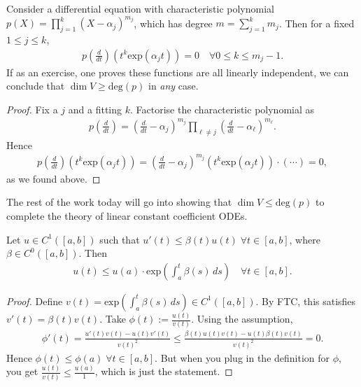 \begin{lemma}\label{lem:polyexp}
    Consider a differential equation with characteristic polynomial $p(X) = \prod_{j=1}^{k}(X-\alpha_{j})^{m_{j}}$, which has degree $m = \sum_{j=1}^{k} m_{j}$. Then for a fixed $1 \leq j \leq k$,
    \begin{align*}
        p \left( \frac{d}{dt} \right) (t^{k} \text{exp}(\alpha_{j} t)) = 0 \quad \forall 0 \leq k \leq m_{j}-1.
    \end{align*}
    If as an exercise, one proves these functions are all linearly independent, we can conclude that $\dim V \geq \text{deg}(p)$ in \textit{any} case.
\end{lemma}
\begin{proof}
    Fix a $j$ and a fitting $k$. Factorise the characteristic polynomial as
    \begin{align*}
        p \left( \frac{d}{dt} \right) = \left( \frac{d}{dt} - \alpha_{j} \right)^{m_{j}} \prod_{\ell \neq j} \left( \frac{d}{dt} - \alpha_{\ell} \right)^{m_{\ell}}.
    \end{align*}
    Hence
    \begin{align*}
        p \left( \frac{d}{dt} \right) \left( t^{k} \text{exp}(\alpha_{j} t) \right) = \left( \frac{d}{dt} - \alpha_{j} \right)^{m_{j}} \left( t^{k} \text{exp}(\alpha_{j} t) \right) \cdot (\cdots) = 0,
    \end{align*}
    as we found above. 
\end{proof}

The rest of the work today will go into showing that $\dim V \leq \text{deg}(p)$ to complete the theory of linear constant coefficient ODEs.

\begin{lemma}\label{lem:gronwall}
    Let $u \in C^{1}([a,b])$ such that $u'(t) \leq \beta(t) u(t)\; \forall t \in [a,b]$, where $\beta \in C^{0}([a,b])$. Then 
    \begin{align*}
        u(t) \leq u(a) \cdot \text{exp}\left( \int_{a}^{t} \beta (s) \, ds \right) \quad \forall t \in [a,b].
    \end{align*}
\end{lemma}
\begin{proof}
    Define $v(t) = \text{exp}\left( \int_{a}^{t} \beta (s) \, ds \right) \in C^{1}([a,b])$. By FTC, this satisfies $v'(t) = \beta (t)v(t)$. Take $\phi(t) := \frac{u(t)}{v(t)}$. Using the assumption,
    \begin{align*}
        \phi'(t) = \frac{u'(t)v(t) - u(t)v'(t)}{v(t)^{2}} \leq \frac{\beta (t) u(t)v(t) - u(t) \beta (t) v(t)}{v(t)^{2}} = 0.
    \end{align*}
    Hence $\phi(t) \leq \phi(a) \; \forall t \in [a,b]$. But when you plug in the definition for $\phi$, you get $\frac{u(t)}{v(t)} \leq \frac{u(a)}{1}$, which is just the statement.
\end{proof}


